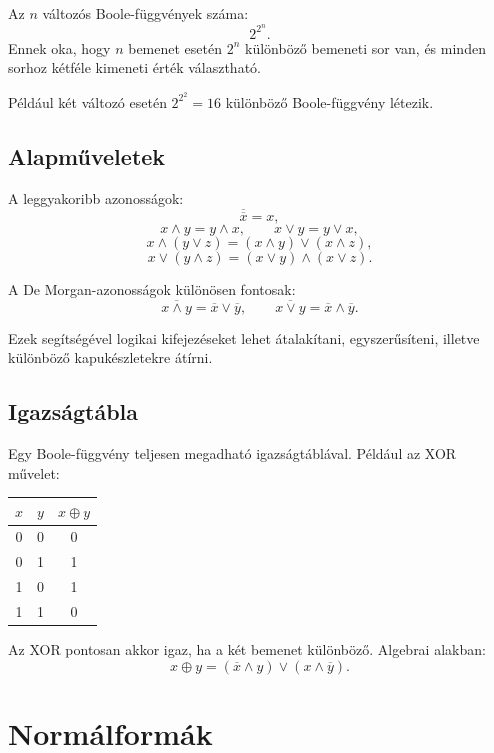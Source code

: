 Az $n$ változós Boole-függvények száma:
\[
  2^{2^n}.
\]
Ennek oka, hogy $n$ bemenet esetén $2^n$ különböző bemeneti sor van, és minden sorhoz kétféle kimeneti érték választható.

Például két változó esetén $2^{2^2}=16$ különböző Boole-függvény létezik.

\subsection{Alapműveletek}

\begin{center}

\end{center}

A leggyakoribb azonosságok:
\[
  \overline{\overline{x}}=x,
\]
\[
  x\wedge y=y\wedge x,
  \qquad
  x\vee y=y\vee x,
\]
\[
  x\wedge(y\vee z)=(x\wedge y)\vee(x\wedge z),
\]
\[
  x\vee(y\wedge z)=(x\vee y)\wedge(x\vee z).
\]

A De Morgan-azonosságok különösen fontosak:
\[
  \overline{x\wedge y}=\overline{x}\vee\overline{y},
  \qquad
  \overline{x\vee y}=\overline{x}\wedge\overline{y}.
\]

Ezek segítségével logikai kifejezéseket lehet átalakítani, egyszerűsíteni, illetve különböző kapukészletekre átírni.

\subsection{Igazságtábla}

Egy Boole-függvény teljesen megadható igazságtáblával. Például az XOR művelet:

\begin{center}
\begin{tabular}{ccc}
\toprule
$x$ & $y$ & $x\oplus y$ \\
\midrule
0 & 0 & 0 \\
0 & 1 & 1 \\
1 & 0 & 1 \\
1 & 1 & 0 \\
\bottomrule
\end{tabular}
\end{center}

Az XOR pontosan akkor igaz, ha a két bemenet különböző. Algebrai alakban:
\[
  x\oplus y=(\overline{x}\wedge y)\vee(x\wedge\overline{y}).
\]

\section{Normálformák}

